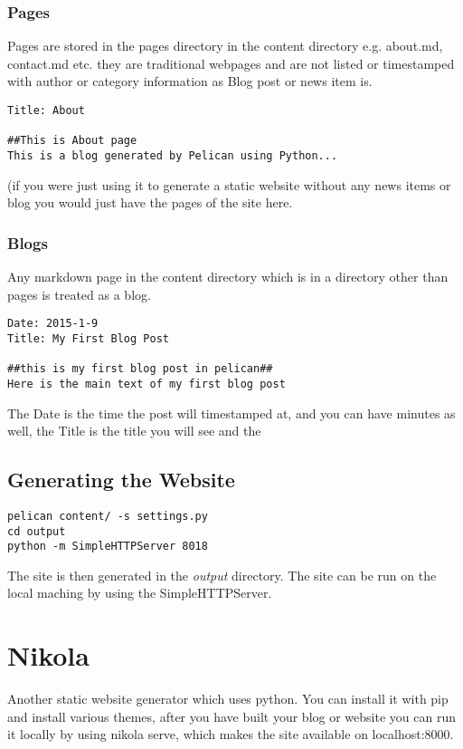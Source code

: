 \documentclass[12pt]{article}			%
\begin{document}
\subsubsection{Pages}
Pages are stored in the pages directory in the content directory e.g. about.md, contact.md etc. they are traditional webpages and are not listed or timestamped with author or category information as Blog post or news item is.

\begin{verbatim}
Title: About

##This is About page
This is a blog generated by Pelican using Python...
\end{verbatim}
(if you were just using it to generate a static website without any news items or blog you would just have the pages of the site here.

\subsubsection{Blogs}
Any markdown page in the content directory which is in a directory other than pages is treated as a blog.

\begin{verbatim}
Date: 2015-1-9
Title: My First Blog Post

##this is my first blog post in pelican##
Here is the main text of my first blog post

\end{verbatim}
The Date is the time the post will timestamped at, and you can have minutes as well, the Title is the title you will see and the
\subsection{Generating the Website}
\begin{verbatim}
pelican content/ -s settings.py
cd output
python -m SimpleHTTPServer 8018
\end{verbatim}
The site is then generated in the \textit{output} directory. The site can be run on the local maching by using the SimpleHTTPServer.


\newpage
\section{Nikola}
Another static website generator which uses python. You can install it with pip and install various themes, after you have built your blog or website you can run it locally by using nikola serve, which makes the site available on localhost:8000.
\end{document}
